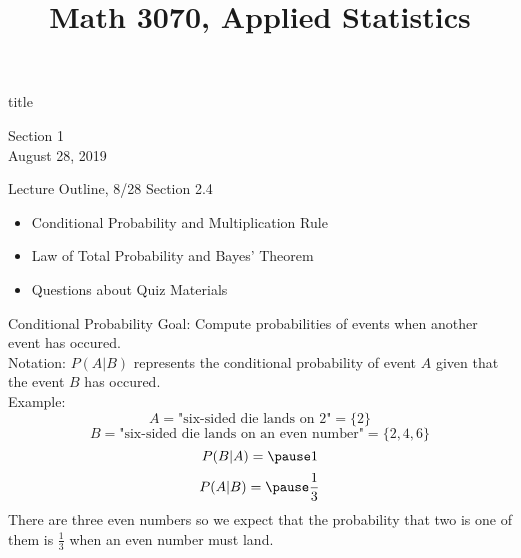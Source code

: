 \documentclass[handout]{beamer}
\title{Math 3070, Applied Statistics}
\newcommand{\nl}[1]{\vspace{#1 em}}
\begin{document}
\begin{frame}
    \begin{beamercolorbox}[rounded=true,wd=\textwidth,center]{title}
        \inserttitle
    \end{beamercolorbox}
    \begin{center}
        Section 1\\
        \nl{0.5}
        August 28, 2019
    \end{center}

\end{frame}

\begin{frame}{Lecture Outline, 8/28}
    Section 2.4
    \begin{itemize}
        \item Conditional Probability and Multiplication Rule
        \item Law of Total Probability and Bayes' Theorem
        \item Questions about Quiz Materials
    \end{itemize}
\end{frame}

\begin{frame}{Conditional Probability}
    Goal: Compute probabilities of events when another event has occured.
    \\
    \nl{0.5}
    Notation: $P(A|B)$ represents the conditional probability of event $A$ given that the event $B$ has occured.
    \\
    \nl{0.5}
    \pause Example: 
    \[A = \text{"six-sided die lands on 2"} = \{2\}\] 
    \[B = \text{"six-sided die lands on an even number"} = \{2,4,6\}\]
    \[P(B|A) = \pause 1\]
    \[P(A|B) = \pause \frac{1}{3}\]
    There are three even numbers so we expect that the probability that two is one of them is $\frac{1}{3}$ when an even number must land.
\end{frame}
\end{document}
